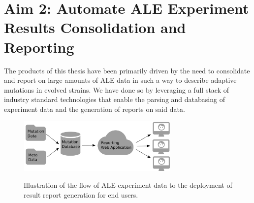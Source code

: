 \documentclass[12pt,final,masters,chapterheads]{ucsd}  %
\begin{document}
%
%
%
%

\chapter{Aim 2: Automate ALE Experiment Results Consolidation and Reporting}

%
%



The products of this thesis have been primarily driven by the need to consolidate and report on large amounts of ALE data in such a way to describe adaptive mutations in evolved strains. We have done so by leveraging a full stack of industry standard technologies that enable the parsing and databasing of experiment data and the generation of reports on said data.

\begin{figure}[H]
  \caption{Illustration of the flow of ALE experiment data to the deployment of result report generation for end users.}
  \centering
  \includegraphics[width=0.7\textwidth]{deployment_diagram.png}
  \label{fig:deployment}
\end{figure}
\end{document}
